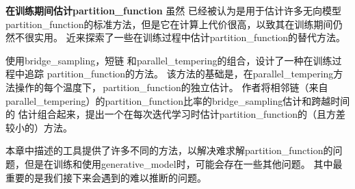 \textbf{在训练期间估计\gls{partition_function}}
虽然\,\,已经被认为是用于估计许多无向模型\gls{partition_function}的标准方法，但是它在计算上代价很高，以致其在训练期间仍然不很实用。
近来探索了一些在训练过程中估计\gls{partition_function}的替代方法。


使用\gls{bridge_sampling}，短链\,\,和\gls{parallel_tempering}的组合，\cite{Desjardins+al-NIPS2011}设计了一种在训练过程中追踪\,\,\gls{partition_function}的方法。
该方法的基础是，在\gls{parallel_tempering}方法操作的每个温度下，\,\gls{partition_function}的独立估计。
作者将相邻链（来自\gls{parallel_tempering}）的\gls{partition_function}比率的\gls{bridge_sampling}估计和跨越时间的\,\,估计组合起来，提出一个在每次迭代学习时估计\gls{partition_function}的（且方差较小的）方法。


本章中描述的工具提供了许多不同的方法，以解决难求解\gls{partition_function}的问题，但是在训练和使用\gls{generative_model}时，可能会存在一些其他问题。
其中最重要的是我们接下来会遇到的难以推断的问题。


